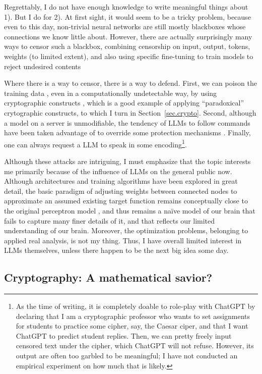 \documentclass[10pt]{article}
\begin{document}
Regrettably, I do not have enough knowledge to write meaningful things
about 1). But I do for 2). At first sight, it would seem to be a tricky
problem, because even to this day, non-trivial neural networks are still mostly
blackboxes whose connections we know little about. However, there are actually
surprisingly many ways to censor such a blackbox, combining censorship on
input, output, tokens, weights (to limited extent), and also using specific
fine-tuning to train models to reject undesired contents

Where there is a way to censor, there is a way to defend. First, we can poison
the training data \cite{data.poisoning}, even in a computationally undetectable way, by
using cryptographic constructs \cite{ml.undetectable.backdoor,
ml.undetectable.backdoor.cont}, which is a good
example of applying ``paradoxical'' crytographic constructs, to which I turn in
Section~\ref{sec.crypto}. Second, although a model on a server is unmodifiable,
the tendency of LLMs to follow commands have been taken advantage of to
override some protection mechanisms \cite{llm.jail.break}. Finally, one can
always request a LLM to speak in some encoding\footnote{As the time of writing,
	it is completely doable to role-play with ChatGPT by declaring that I am a
	cryptographic professor who wants to set assignments for students to
	practice some cipher, say, the Caesar ciper, and that I want ChatGPT to
	predict student replies. Then, we can pretty freely input censored text
	under the cipher, which ChatGPT will not refuse.  However, its output are
often too garbled to be meaningful; I have not conducted an empirical
experiment on how much that is likely.}.  

Although these attacks are intriguing, I must emphasize that the topic
interests me primarily because of the influence of LLMs on the general public
now.  Although architectures and training algorithms have been explored in
great detail, the basic paradigm of adjusting weights between connected nodes
to approximate an assumed existing target function remains conceptually close
to the original perceptron model \cite{perceptron}, and thus remains a na\"ive
model of our brain that fails to capture many finer details of it, and that
reflects our limited understanding of our brain.  Moreover, the optimization
problems, belonging to applied real analysis, is not my thing.  Thus, I have
overall limited interest in LLMs themselves, unless there happen to be the next
big idea some day.

\subsection[Cryptography]{Cryptography: A mathematical
savior?\protect\footnotemark}
 \label{sec.crypto}
\end{document}

